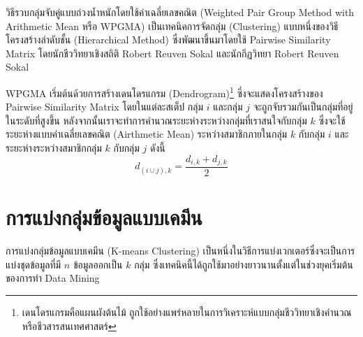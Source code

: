 วิธีรวบกลุ่มจับคู่แบบถ่วงน้ำหนักโดยใช้ค่าเฉลี่ยเลขคณิต (Weighted Pair Group Method with Arithmetic Mean หรือ WPGMA) เป็นเทคนิคการจัดกลุ่ม (Clustering) แบบหนึ่งของวิธีโครงสร้างลำดับชั้น (Hierarchical Method) ซึ่งพัฒนาขึ้นมาโดยใช้ Pairwise Similarity Matrix\autocite{sokal1958} โดยนักชีววิทยาเชิงสถิติ Robert Reuven Sokal และนักกีฏวิทยา Robert Reuven Sokal

WPGMA เริ่มต้นด้วยการสร้างเดนโดรแกรม (Dendrogram)\footnote{เดนโดรแกรมคือแผนผังต้นไม้ ถูกใช้อย่างแพร่หลายในการวิเคราะห์แบบกลุ่มชีววิทยาเชิงคำนวณหรือชีวสารสนเทศศาสตร์} ซึ่งจะแสดงโครงสร้างของ Pairwise Similarity Matrix โดยในแต่ละสเต็ป กลุ่ม $i$ และกลุ่ม $j$ จะถูกจับรวมกันเป็นกลุ่มที่อยู่ในระดับที่สูงขึ้น หลังจากนั้นเราจะทำการคำนวณระยะห่างระหว่างกลุ่มที่เราสนใจกับกลุ่ม $k$ ซึ่งจะใช้ระยะห่างแบบค่าเฉลี่ยเลขคณิต (Airthmetic Mean) ระหว่างสมาชิกภายในกลุ่ม $k$ กับกลุ่ม $i$ และระยะห่างระหว่างสมาชิกกลุ่ม $k$ กับกลุ่ม $j$ ดังนี้
%
\begin{equation}\label{eq:wpgma}
    d_{(i \cup j),k} = \frac{d_{i,k} + d_{j,k}}{2}
\end{equation}

\section{การแบ่งกลุ่มข้อมูลแบบเคมีน}
\label{sec:k_means}

การแบ่งกลุ่มข้อมูลแบบเคมีน (K-means Clustering) เป็นหนึ่งในวิธีการแบ่งเวกเตอร์ซึ่งจะเป็นการแบ่งชุดข้อมูลที่มี $n$ ข้อมูลออกเป็น $k$ กลุ่ม ซึ่งเทคนิคนี้ได้ถูกใช้มาอย่างยาวนานตั้งแต่ในช่วงยุคเริ่มต้นของการทำ Data Mining\autocite{macqueen1967}

